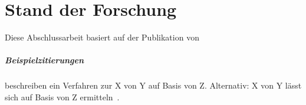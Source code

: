 \chapter{Stand der Forschung}\label{ch:relatedWork}

Diese Abschlussarbeit basiert auf der Publikation von 
\paragraph{Beispielzitierungen}
\citet{sniktec} beschreiben ein Verfahren zur X von Y auf Basis von Z.
Alternativ: X von Y lässt sich auf Basis von Z ermitteln~\citep{sniktec}.

